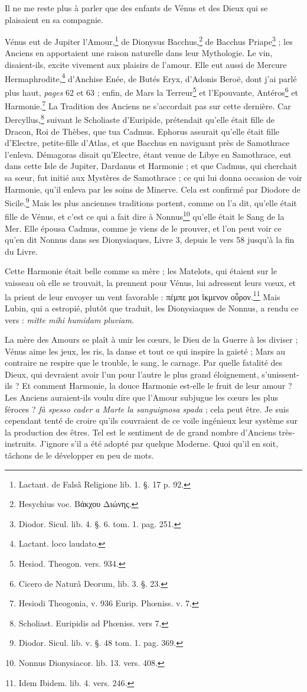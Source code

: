 \documentclass[a4paper, 11pt, oneside, polutonikogreek, french]{article}
\begin{document}
Il ne me reste plus à parler que des enfants de Vénus et des Dieux qui se plaisaient en sa compagnie.

Vénus eut de Jupiter l'Amour,\footnote{Lactant. de Falsâ Religione lib. 1. §. 17 p. 92.} de Dionysus Bacchus,\footnote{Hesychius voc. Βάκχου Διώνης.} de Bacchus Priape\footnote{Diodor. Sicul. lib. 4. §. 6. tom. 1. pag. 251.} ; les Anciens en apportaient une raison naturelle dans leur Mythologie. Le vin, disaient-ils, excite vivement aux plaisirs de l'amour. Elle eut aussi de Mercure Hermaphrodite,\footnote{Lactant. loco laudato.} d'Anchise Enée, de Butés Eryx, d'Adonis Beroë, dont j'ai parlé plus haut, \emph{pages} 62 et 63 ; enfin, de Mars la Terreur\footnote{Hesiod. Theogon. vers. 934.} et l'Epouvante, Antéros\footnote{Cicero de Naturâ Deorum, lib. 3. §. 23.} et Harmonie.\footnote{Hesiodi Theogonia, v. 936 Eurip. Phœniss. v. 7.} La Tradition des Anciens ne s'accordait pas sur cette dernière. Car Dercyllus,\footnote{Scholiast. Euripidis ad Phœniss. vers 7.} suivant le Scholiaste d'Euripide, prétendait qu'elle était fille de Dracon, Roi de Thèbes, que tua Cadmus. Ephorus assurait qu'elle était fille d'Electre, petite-fille d'Atlas, et que Bacchus en naviguant près de Samothrace l'enleva. Démagoras disait qu'Electre, étant venue de Libye en Samothrace, eut dans cette Isle de Jupiter, Dardanus et Harmonie ; et que Cadmus, qui cherchait sa sœur, fut initié aux Mystères de Samothrace ; ce qui lui donna occasion de voir Harmonie, qu'il enleva par les soins de Minerve. Cela est confirmé par Diodore de Sicile.\footnote{Diodor. Sicul. lib. v. §. 48 tom. 1. pag. 369.} Mais les plus anciennes traditions portent, comme on l'a dit, qu'elle était fille de Vénus, et c'est ce qui a fait dire à Nonnus\footnote{Nonnus Dionysiacor. lib. 13. vers. 408.} qu'elle était le Sang de la Mer. Elle épousa Cadmus, comme je viens de le prouver, et l'on peut voir ce qu'en dit Nonnus dans ses Dionysiaques, Livre 3, depuis le vers 58 jusqu'à la fin du Livre.

Cette Harmonie était belle comme sa mère ; les Matelots, qui étaient sur le vaisseau où elle se trouvait, la prennent pour Vénus, lui adressent leurs vœux, et la prient de leur envoyer un vent favorable : πέμπε μοι ἴκμενον οὖρον.\footnote{Idem Ibidem. lib. 4. vers. 246.} Mais Lubin, qui a estropié, plutôt que traduit, les Dionysiaques de Nonnus, a rendu ce vers : \emph{mitte mihi humidam pluviam}.

La mère des Amours se plaît à unir les cœurs, le Dieu de la Guerre à les diviser ; Vénus aime les jeux, les ris, la danse et tout ce qui inspire la gaieté ; Mars au contraire ne respire que le trouble, le sang, le carnage. Par quelle fatalité des Dieux, qui devraient avoir l'un pour l'autre le plus grand éloignement, s'unissent-ils ? Et comment Harmonie, la douce Harmonie est-elle le fruit de leur amour ? Les Anciens auraient-ils voulu dire que l'Amour subjugue les cœurs les plus féroces ? \emph{fà spesso cader a Marte la sanguignosa spada} ; cela peut être. Je suis cependant tenté de croire qu'ils couvraient de ce voile ingénieux leur système sur la production des êtres. Tel est le sentiment de de grand nombre d'Anciens très-instruits. J'ignore s'il a été adopté par quelque Moderne. Quoi qu'il en soit, tâchons de le développer en peu de mots.
\end{document}
